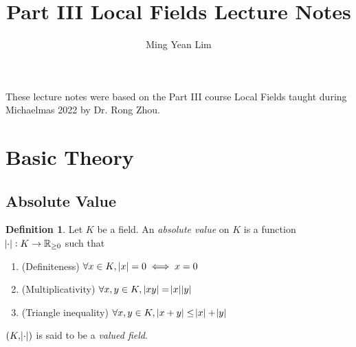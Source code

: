 \documentclass[11pt]{article}
\title{Part III Local Fields Lecture Notes}
\author{Ming Yean Lim}
\theoremstyle{definition}
\newtheorem{definition}{Definition}[subsection]
\theoremstyle{plain}
\theoremstyle{remark}
\newcommand{\bR}{\mathbb{R}}
\begin{document}
\maketitle

\noindent These lecture notes were based on the Part III course Local Fields taught during Michaelmas 2022 by Dr. Rong Zhou.

\section{Basic Theory}

\subsection{Absolute Value}

\begin{definition}
    Let $K$ be a field. An \emph{absolute value} on $K$ is a function $\abs{\cdot} : K \to \bR_{\ge 0}$ such that
    \begin{enumerate}
        \item (Definiteness) $\forall x \in K,\, \abs{x} = 0 \iff x = 0$
        \item (Multiplicativity) $\forall x, y \in K,\, \abs{x y} = \abs{x} \abs{y}$
        \item (Triangle inequality) $\forall x, y \in K,\, \abs{x + y} \le \abs{x} + \abs{y}$
    \end{enumerate}
    $(K, \abs{\cdot})$ is said to be a \emph{valued field}.
\end{definition}
\end{document}
